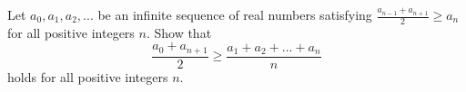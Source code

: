 Let $a_0,a_1,a_2,...$ be an infinite sequence of real numbers satisfying $\frac{a_{n-1}+a_{n+1}}{2}\geq a_n$ for all positive integers $n$. Show that $$\frac{a_0+a_{n+1}}{2}\geq \frac{a_1+a_2+...+a_n}{n}$$holds for all positive integers $n$.